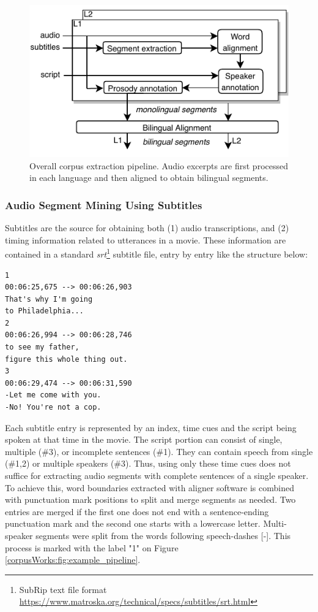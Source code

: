 \begin{figure}[t]
  \centering
  \includegraphics[width=0.6\linewidth]{img/movie2parallelDB/movie2parallelDB-pipeline.pdf}
  \caption[Overall parallel corpus extraction pipeline from movies.]{Overall corpus extraction pipeline. Audio excerpts are first processed in each language and then aligned to obtain bilingual segments.}
  \label{corpusWorks:fig:overall-scheme}
\end{figure}

\subsubsection*{Audio Segment Mining Using Subtitles}
Subtitles are the source for obtaining both (1) audio transcriptions, and (2) timing information related to utterances in a movie. These information are contained in a standard \textit{srt}\footnote{SubRip text file format \url{https://www.matroska.org/technical/specs/subtitles/srt.html}} subtitle file, entry by entry like the structure below:

\begin{lstlisting}
1
00:06:25,675 --> 00:06:26,903
That's why I'm going
to Philadelphia...
2
00:06:26,994 --> 00:06:28,746
to see my father,
figure this whole thing out.
3
00:06:29,474 --> 00:06:31,590
-Let me come with you.
-No! You're not a cop.
\end{lstlisting}

Each subtitle entry is represented by an index, time cues and the script being spoken at that time in the movie. The script portion can consist of single, multiple (\#3), or incomplete sentences (\#1). They can contain speech from single (\#1,2) or multiple speakers (\#3). Thus, using only these time cues does not suffice for extracting audio segments with complete sentences of a single speaker. To achieve this, word boundaries extracted with aligner software is combined with punctuation mark positions to split and merge segments as needed. Two entries are merged if the first one does not end with a sentence-ending punctuation mark and the second one starts with a lowercase letter. Multi-speaker segments were split from the words following speech-dashes [-]. This process is marked with the label "1" on Figure \ref{corpusWorks:fig:example_pipeline}.

